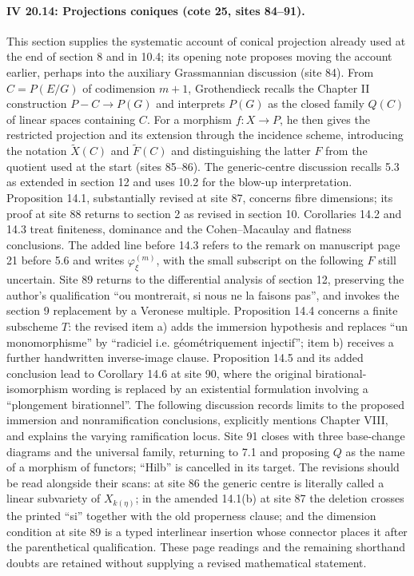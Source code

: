 \paragraph{IV 20.14: Projections coniques (cote 25, sites 84--91).}
This section supplies the systematic account of conical projection already used at the end of section 8 and in 10.4; its opening note proposes moving the account earlier, perhaps into the auxiliary Grassmannian discussion (site 84). From $C=P(E/G)$ of codimension $m+1$, Grothendieck recalls the Chapter II construction $P-C\to P(G)$ and interprets $P(G)$ as the closed family $Q(C)$ of linear spaces containing $C$. For a morphism $f:X\to P$, he then gives the restricted projection and its extension through the incidence scheme, introducing the notation $\widetilde X(C)$ and $\widetilde F(C)$ and distinguishing the latter $F$ from the quotient used at the start (sites 85--86). The generic-centre discussion recalls 5.3 as extended in section 12 and uses 10.2 for the blow-up interpretation. Proposition 14.1, substantially revised at site 87, concerns fibre dimensions; its proof at site 88 returns to section 2 as revised in section 10. Corollaries 14.2 and 14.3 treat finiteness, dominance and the Cohen--Macaulay and flatness conclusions. The added line before 14.3 refers to the remark on manuscript page 21 before 5.6 and writes $\varphi^{(m)}_\xi$, with the small subscript on the following $F$ still uncertain. Site 89 returns to the differential analysis of section 12, preserving the author's qualification ``ou montrerait, si nous ne la faisons pas'', and invokes the section 9 replacement by a Veronese multiple. Proposition 14.4 concerns a finite subscheme $T$: the revised item a) adds the immersion hypothesis and replaces ``un monomorphisme'' by ``radiciel i.e. géométriquement injectif''; item b) receives a further handwritten inverse-image clause. Proposition 14.5 and its added conclusion lead to Corollary 14.6 at site 90, where the original birational-isomorphism wording is replaced by an existential formulation involving a ``plongement birationnel''. The following discussion records limits to the proposed immersion and nonramification conclusions, explicitly mentions Chapter VIII, and explains the varying ramification locus. Site 91 closes with three base-change diagrams and the universal family, returning to 7.1 and proposing $Q$ as the name of a morphism of functors; ``Hilb'' is cancelled in its target. The revisions should be read alongside their scans: at site 86 the generic centre is literally called a linear subvariety of $X_{k(\eta)}$; in the amended 14.1(b) at site 87 the deletion crosses the printed ``si'' together with the old properness clause; and the dimension condition at site 89 is a typed interlinear insertion whose connector places it after the parenthetical qualification. These page readings and the remaining shorthand doubts are retained without supplying a revised mathematical statement.
